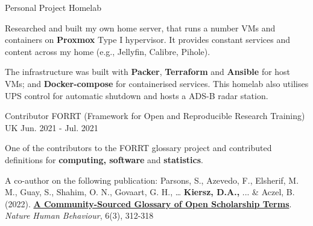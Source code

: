\begin{cventries}
   	

  \cventry
   	{Personal Project}
    {Homelab}
    {} %
    {} %
    {
     \begin{cvitems} 
     	\item Researched and built my own home server, that runs a number VMs and containers on \textbf{Proxmox} Type I hypervisor. It provides constant services and content across my home (e.g., Jellyfin, Calibre, Pihole). 
     	\item The infrastructure was built with \textbf{Packer}, \textbf{Terraform} and \textbf{Ansible} for host VMs; and \textbf{Docker-compose} for containerised services. This homelab also utilises UPS control for automatic shutdown and hosts a ADS-B radar station.
     \end{cvitems}
     }
     


  \cventry
    {Contributor} %
    {FORRT (Framework for Open and Reproducible Research Training)} %
    {UK} %
    {Jun. 2021 - Jul. 2021} %
    {
      \begin{cvitems} %
		\item One of the contributors to the FORRT glossary project and contributed definitions for \textbf{computing, software} and \textbf{statistics}. 
		\item A co-author on the following publication: Parsons, S., Azevedo, F., Elsherif, M. M., Guay, S., Shahim, O. N., Govaart, G. H., … \textbf{Kiersz, D.A.,} ... \& Aczel, B. (2022). \textbf{\href{https://www.nature.com/articles/s41562-021-01269-4}{A Community-Sourced Glossary of Open Scholarship Terms}}. \textit{Nature Human Behaviour}, 6(3), 312-318
      \end{cvitems}
    }


\end{cventries}
